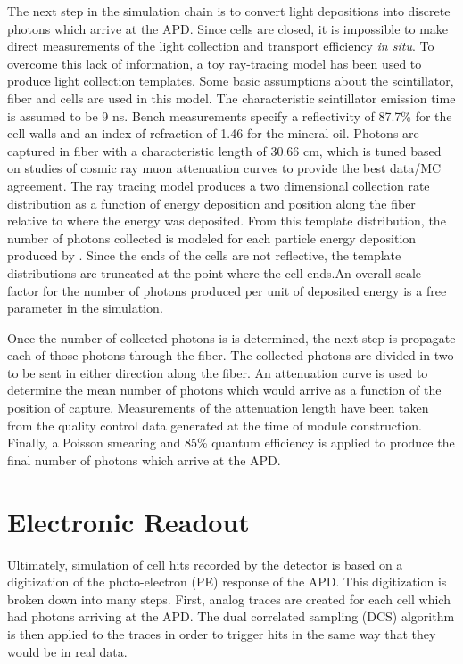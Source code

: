 The next step in the simulation chain is to convert light depositions into discrete photons which arrive at the APD.  Since \nova cells are closed, it is impossible to make direct measurements of the light collection and transport efficiency \textit{in situ}.  To overcome this lack of information, a toy ray-tracing model has been used to produce light collection templates.  Some basic assumptions about the scintillator, fiber and cells are used in this model.  The characteristic scintillator emission time is assumed to be 9 ns.  Bench measurements specify a reflectivity of 87.7\% for the cell walls and an index of refraction of 1.46 for the mineral oil.  Photons are captured in fiber with a characteristic length of 30.66 cm, which is tuned based on studies of cosmic ray muon attenuation curves to provide the best data/MC agreement.  The ray tracing model produces a two dimensional collection rate  distribution as a function of energy deposition and position along the fiber relative to where the energy was deposited.  From this template distribution, the number of photons collected is modeled for each particle energy deposition produced by \geant.  Since the ends of the cells are not reflective, the template distributions are truncated at the point where the cell ends.An overall scale factor for the number of photons produced per unit of deposited energy is a free parameter in the simulation.

Once the number of collected photons is is determined, the next step is propagate each of those photons through the fiber.  The collected photons are divided in two to be sent in either direction along the fiber.  An attenuation curve is used to determine the mean number of photons which would arrive as a function of the position of capture.  Measurements of the attenuation length have been taken from the quality control data generated at the time of module construction.  Finally, a Poisson smearing and 85\% quantum efficiency is applied to produce the final number of photons which arrive at the APD.

\section{Electronic Readout}


Ultimately, simulation of cell hits recorded by the detector is based on a digitization of the photo-electron (PE) response of the APD.  This digitization is broken down into many steps.  First, analog traces are created for each cell which had photons arriving at the APD.  The dual correlated sampling (DCS) algorithm is then applied to the traces in order to trigger hits in the same way that they would be in real data.

